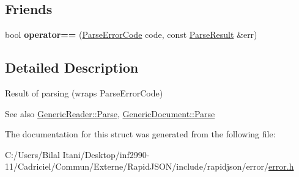 \subsection*{Friends}
\begin{DoxyCompactItemize}
\item 
bool {\bfseries operator==} (\hyperlink{group___r_a_p_i_d_j_s_o_n___e_r_r_o_r_s_ga8d4b32dfc45840bca189ade2bbcb6ba7}{Parse\+Error\+Code} code, const \hyperlink{struct_parse_result}{Parse\+Result} \&err)\hypertarget{struct_parse_result_a58c9982e833d1c74686506ac7449200c}{}\label{struct_parse_result_a58c9982e833d1c74686506ac7449200c}

\end{DoxyCompactItemize}


\subsection{Detailed Description}
Result of parsing (wraps Parse\+Error\+Code) 


 \begin{DoxySeeAlso}{See also}
\hyperlink{class_generic_reader_a0c450620d14ff1824e58bb7bd9b42099}{Generic\+Reader\+::\+Parse}, \hyperlink{class_generic_document_aebd4e7fddd80c1e1174837aee6d2159b}{Generic\+Document\+::\+Parse} 
\end{DoxySeeAlso}


The documentation for this struct was generated from the following file\+:\begin{DoxyCompactItemize}
\item 
C\+:/\+Users/\+Bilal Itani/\+Desktop/inf2990-\/11/\+Cadriciel/\+Commun/\+Externe/\+Rapid\+J\+S\+O\+N/include/rapidjson/error/\hyperlink{error_8h}{error.\+h}\end{DoxyCompactItemize}
